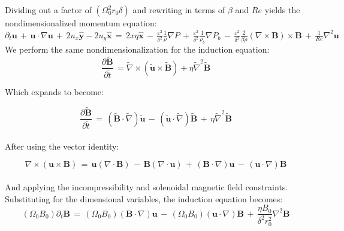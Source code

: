 \documentclass[letterpaper,12pt]{article}
\newcommand\reye{\mathrel{Re}}
\begin{document}
Dividing out a factor of $\left(\Omega_0^2 r_0 \delta\right)$ and rewriting in terms of $\beta$ and $\reye$ yields the nondimensionalized momentum equation: \\

$\partial_t \mathbf{u} \, + \, \mathbf{u} \cdot \nabla \mathbf{u} \, + \, 2 u_x \mathbf{\hat{y}} - 2 u_y \mathbf{\hat{x}} \, = \, 2 x q \mathbf{\hat{x}} \, - \, \frac{\varepsilon^2}{\delta^2} \frac{1}{\rho} \nabla P \, + \,  \frac{\varepsilon^2}{\delta^2} \frac{1}{\rho_b} \nabla P_b \, - \, \frac{\varepsilon^2}{\delta^2} \frac{2}{\beta \rho} \left( \nabla \times \mathbf{B} \right) \times \mathbf{B} \, + \, \frac{1}{\reye} \nabla^2 \mathbf{u}$ \\

We perform the same nondimensionalization for the induction equation: \\

\[\frac{\partial \widetilde{\mathbf{B}}}{\partial \widetilde{t}} \,  = \widetilde{\nabla} \times \left(\widetilde{\mathbf{u}} \times \widetilde{\mathbf{B}}\right) + \eta\widetilde{\nabla}^2 \widetilde{\mathbf{B}} \] 

Which expands to become:

\[\frac{\partial \widetilde{\mathbf{B}}}{\partial \widetilde{t}} \, = \, \left(\widetilde{\mathbf{B}} \cdot \widetilde{\nabla} \right) \widetilde{\mathbf{u}} \, - \, \left(\widetilde{\mathbf{u}} \cdot \widetilde{\nabla} \right) \widetilde{\mathbf{B}} \, + \, \eta \widetilde{\nabla}^2\widetilde{\mathbf{B}} \] \\

After using the vector identity:

\[\nabla \times \left(\mathbf{u} \times \mathbf{B}\right) \, = \, \mathbf{u}\left(\nabla \cdot \mathbf{B}\right) \, - \, \mathbf{B}\left(\nabla \cdot \mathbf{u}\right) \, + \, \left(\mathbf{B} \cdot \nabla\right)\mathbf{u} \, - \, \left(\mathbf{u} \cdot \nabla\right)\mathbf{B} \] \\

And applying the incompressibility and solenoidal magnetic field constraints. \\

Substituting for the dimensional variables, the induction equation becomes: \\

\[\left(\Omega_0 B_0\right) \partial_t\mathbf{B} \, = \, \left(\Omega_0 B_0\right)\left(\mathbf{B} \cdot \nabla\right)\mathbf{u} \, - \, \left(\Omega_0 B_0\right)\left(\mathbf{u} \cdot \nabla \right)\mathbf{B} \, + \, \frac{\eta B_0}{\delta^2 r_0^2}\nabla^2\mathbf{B} \]
\end{document}
